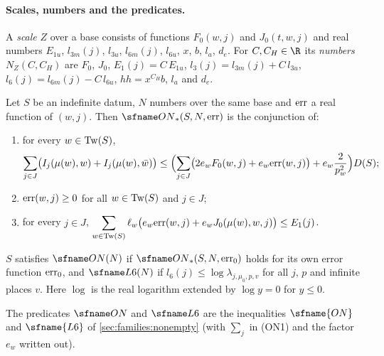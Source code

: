 \paragraph{Scales, numbers and the predicates.}
A \emph{scale} $Z$ over a base consists of functions $F_0(w,j)$ and $J_0(t,w,j)$ and real numbers $E_{1u}$,
$l_{3m}(j)$, $l_{3u}$, $l_{6m}(j)$, $l_{6u}$, $x$, $b$, $l_a$, $d_e$. For $C,C_H\in\R$ its \emph{numbers}
$N_Z(C,C_H)$ are $F_0$, $J_0$, $E_1(j)=C\,E_{1u}$, $l_3(j)=l_{3m}(j)+C\,l_{3u}$,
$l_6(j)=l_{6m}(j)-C\,l_{6u}$, $hh=x^{C_H}b$, $l_a$ and $d_e$.

\begin{definition}\label{pf:onto3:defON}
Let $S$ be an indefinite datum, $N$ numbers over the same base and $\mathrm{err}$ a real function of
$(w,j)$. Then $\ontothreeONw(S,N,\ontothreeerr)$ is the conjunction of:
\begin{enumerate}[label=(ON\arabic*)]
\item for every $w\in\mathrm{Tw}(S)$,
\[
\sum_{j\in J}\bigl(I_j(\mu(w),w)+I_j(\mu(w),\bar w)\bigr)\le
\Bigl(\sum_{j\in J}\bigl(2e_wF_0(w,j)+e_w\mathrm{err}(w,j)\bigr)+e_w\frac{2}{p_w^2}\Bigr)D(S);
\]
\item $\mathrm{err}(w,j)\ge0$ for all $w\in\mathrm{Tw}(S)$ and $j\in J$;
\item for every $j\in J$,
$\displaystyle\sum_{w\in\mathrm{Tw}(S)}\ell_w\bigl(e_w\mathrm{err}(w,j)+e_wJ_0(\mu(w),w,j)\bigr)\le E_1(j)$.
\end{enumerate}
$S$ satisfies $\ontothreeON(N)$ if $\ontothreeONw(S,N,\ontothreeerr_0)$ holds for its own error function
$\mathrm{err}_0$, and $\ontothreeLsix(N)$ if $l_6(j)\le\log\lambda_{j,\mu_0,p,v}$ for all $j$, $p$ and infinite
places $v$. Here $\log$ is the real logarithm extended by $\log y=0$ for $y\le0$.
\end{definition}

The predicates $\ontothreeON$ and $\ontothreeLsix$ are the inequalities $\sfname{ON}$ and $\sfname{L6}$ of
\cref{sec:families:nonempty} (with $\sum_j$ in (ON1) and the factor $e_w$ written out).

